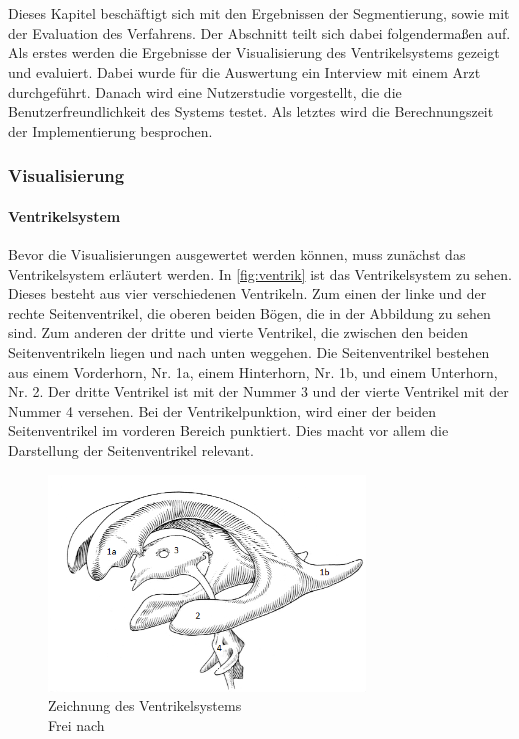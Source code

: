 \chapter{}
\label{sec:results}





Dieses Kapitel beschäftigt sich mit den Ergebnissen der Segmentierung, sowie mit der Evaluation des Verfahrens. Der Abschnitt teilt sich dabei folgendermaßen auf. Als erstes werden die Ergebnisse der Visualisierung des Ventrikelsystems gezeigt und evaluiert. Dabei wurde für die Auswertung ein Interview mit einem Arzt durchgeführt. Danach wird eine Nutzerstudie vorgestellt, die die Benutzerfreundlichkeit des Systems testet. Als letztes wird die Berechnungszeit der Implementierung besprochen.


\subsection{Visualisierung}

\subsubsection{Ventrikelsystem}

Bevor die Visualisierungen ausgewertet werden können, muss zunächst das Ventrikelsystem erläutert werden. In \autoref{fig:ventrik} ist das Ventrikelsystem zu sehen. Dieses besteht aus vier verschiedenen Ventrikeln. Zum einen der linke und der rechte Seitenventrikel, die oberen beiden Bögen, die in der Abbildung zu sehen sind. Zum anderen der dritte und vierte Ventrikel, die zwischen den beiden Seitenventrikeln liegen und nach unten weggehen. Die Seitenventrikel bestehen aus einem Vorderhorn, Nr. 1a,  einem Hinterhorn, Nr. 1b, und einem Unterhorn, Nr. 2. Der dritte Ventrikel ist mit der Nummer 3 und der vierte Ventrikel mit der Nummer 4 versehen. Bei der Ventrikelpunktion, wird einer der beiden Seitenventrikel im vorderen Bereich punktiert. Dies macht vor allem die Darstellung der Seitenventrikel relevant.

\begin{figure}[!h] 
\centering 
\includegraphics[width=0.75\textwidth]{Logos/Ventrikelsystem_V3.png}
\caption{Zeichnung des Ventrikelsystems  \\  Frei nach \protect\cite{ventrik}} 
\label{fig:ventrik} 
\end{figure}


